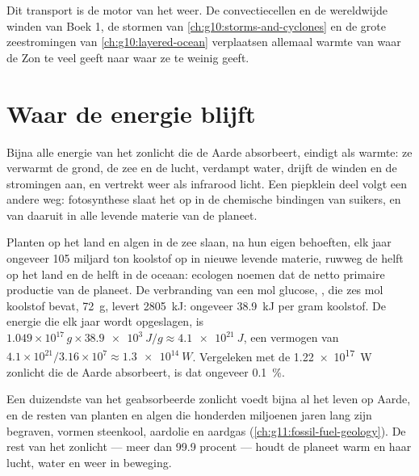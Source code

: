 Dit transport is de motor van het weer. De convectiecellen en de wereldwijde
winden van Boek 1, de stormen van \cref{ch:g10:storms-and-cyclones} en de grote
zeestromingen van \cref{ch:g10:layered-ocean} verplaatsen allemaal warmte van
waar de Zon te veel geeft naar waar ze te weinig geeft.

\section{Waar de energie blijft}

Bijna alle energie van het zonlicht die de Aarde absorbeert, eindigt als warmte:
ze verwarmt de grond, de zee en de lucht, verdampt water, drijft de winden en
de stromingen aan, en vertrekt weer als infrarood licht. Een piepklein deel
volgt een andere weg: fotosynthese slaat het op in de chemische bindingen van
suikers, en van daaruit in alle levende materie van de planeet.

\begin{example}\label{ex:g10:earth-energy-budget:photosynthesis}
Planten op het land en algen in de zee slaan, na hun eigen behoeften, elk jaar
ongeveer \num{105} miljard ton koolstof op in nieuwe levende materie, ruwweg de
helft op het land en de helft in de oceaan: ecologen noemen dat de netto
primaire productie van de planeet. De verbranding van een mol glucose,
, die zes mol koolstof bevat, \qty{72}{g}, levert
\qty{2805}{kJ}: ongeveer \qty{38.9}{kJ} per gram koolstof. De energie die elk
jaar wordt opgeslagen, is $1.049\times10^{17}\,\unit{g} \times \qty{38.9e3}{J/g} \approx
\qty{4.1e21}{J}$, een vermogen van $4.1\times10^{21}/3.16\times10^{7} \approx
\qty{1.3e14}{W}$. Vergeleken met de \qty{1.22e17}{W} zonlicht die de Aarde
absorbeert, is dat ongeveer \qty{0.1}{\percent}.
\end{example}

\begin{remark}\label{rem:g10:earth-energy-budget:life}
Een duizendste van het geabsorbeerde zonlicht voedt bijna al het leven op
Aarde, en de resten van planten en algen die honderden miljoenen jaren lang zijn
begraven, vormen steenkool, aardolie en aardgas
(\cref{ch:g11:fossil-fuel-geology}). De rest van het zonlicht --- meer dan
99.9 procent --- houdt de planeet warm en haar lucht, water en weer in beweging.
\end{remark}

